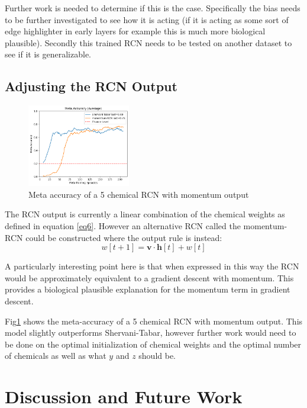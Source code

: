 \documentclass[a4paper, 11pt, oneside]{report}
\begin{document}
Further work is needed to determine if this is the case. Specifically the bias needs to be further investigated to see 
how it is acting (if it is acting as some sort of edge highlighter in early layers for example this is much more biological plausible).
Secondly this trained RCN needs to be tested on another dataset to see if it is generalizable.

\subsection*{Adjusting the RCN Output}

\begin{figure}[H]
    \centering
    \includegraphics[width=0.4\textwidth]{mode3.png}
    \caption{Meta accuracy of a 5 chemical RCN with momentum output}
    \label{fig:mode3}
\end{figure}

The RCN output is currently a linear combination of the chemical weights as defined in equation \ref{eq6}.
However an alternative RCN called the momentum-RCN could be constructed where the output rule is instead:
\begin{equation}
    w[t+1] = \mathbf{v} \cdot \mathbf{h}[t] + w[t]
\end{equation}

A particularly interesting point here is
that when expressed in this way the RCN would be approximately equivalent to a gradient descent
with momentum. This provides a biological plausible explanation for the momentum term in gradient descent.


Fig\ref{fig:mode3} shows the meta-accuracy of a 5 chemical RCN with momentum output. This model slightly outperforms Shervani-Tabar,
however further work would need to be done on the optimal initialization of chemical weights and the optimal number of chemicals
as well as what $y$ and $z$ should be.

\section*{Discussion and Future Work}
\end{document}
